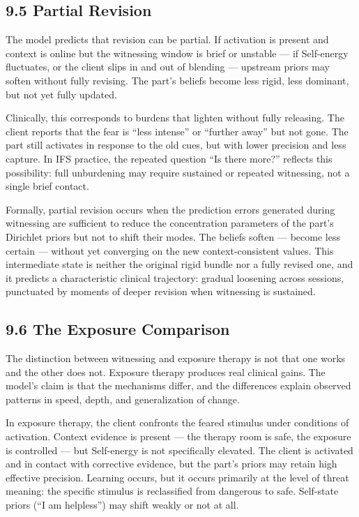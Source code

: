 \documentclass[11pt]{article}
\begin{document}
\subsection{9.5 Partial Revision}\label{partial-revision}

The model predicts that revision can be partial. If activation is
present and context is online but the witnessing window is brief or
unstable --- if Self-energy fluctuates, or the client slips in and out
of blending --- upstream priors may soften without fully revising. The
part's beliefs become less rigid, less dominant, but not yet fully
updated.

Clinically, this corresponds to burdens that lighten without fully
releasing. The client reports that the fear is ``less intense'' or
``further away'' but not gone. The part still activates in response to
the old cues, but with lower precision and less capture. In IFS
practice, the repeated question ``Is there more?'' reflects this
possibility: full unburdening may require sustained or repeated
witnessing, not a single brief contact.

Formally, partial revision occurs when the prediction errors generated
during witnessing are sufficient to reduce the concentration parameters
of the part's Dirichlet priors but not to shift their modes. The beliefs
soften --- become less certain --- without yet converging on the new
context-consistent values. This intermediate state is neither the
original rigid bundle nor a fully revised one, and it predicts a
characteristic clinical trajectory: gradual loosening across sessions,
punctuated by moments of deeper revision when witnessing is sustained.

\subsection{9.6 The Exposure Comparison}\label{the-exposure-comparison}

The distinction between witnessing and exposure therapy is not that one
works and the other does not. Exposure therapy produces real clinical
gains. The model's claim is that the mechanisms differ, and the
differences explain observed patterns in speed, depth, and
generalization of change.

In exposure therapy, the client confronts the feared stimulus under
conditions of activation. Context evidence is present --- the therapy
room is safe, the exposure is controlled --- but Self-energy is not
specifically elevated. The client is activated and in contact with
corrective evidence, but the part's priors may retain high effective
precision. Learning occurs, but it occurs primarily at the level of
threat meaning: the specific stimulus is reclassified from dangerous to
safe. Self-state priors (``I am helpless'') may shift weakly or not at
all.
\end{document}
